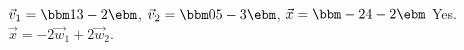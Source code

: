 {$\vec{v}_1 = \bbm 1\\3\\-2\ebm$, $\vec{v}_2 = \bbm 0\\5\\-3\ebm$, $\vec{x} = \bbm -2\\4\\-2\ebm$}
{Yes. $\vec{x} = -2\vec{w}_1+2\vec{w}_2$.}